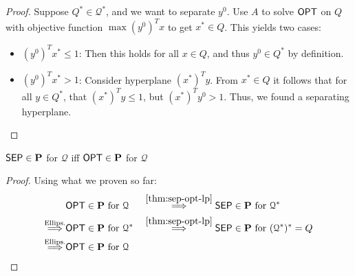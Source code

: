 \begin{proof}
    Suppose $Q^* \in \mathcal{Q}^*$, and we want to separate $y^0$.
    Use $A$ to solve $\mathsf{OPT}$ on $Q$ with objective function $\max (y^0)^Tx$ to get $x^* \in Q$.
    This yields two cases:
    \begin{itemize}
        \item $(y^0)^Tx^* \leq 1$: Then this holds for all $x \in Q$, and thus $y^0 \in Q^*$ by definition.
        \item $(y^0)^Tx^* > 1$: Consider hyperplane $(x^*)^Ty$. From $x^* \in Q$ it follows that
              for all $y \in Q^*$, that $(x^*)^Ty \leq 1$, but $(x^*)^Ty^0 > 1$. Thus, we found a separating hyperplane.
    \end{itemize}
\end{proof}
\begin{theorem}
    $\mathsf{SEP} \in \mathbf{P}$ for $\mathcal{Q}$ iff $\mathsf{OPT} \in \mathbf{P}$ for $\mathcal{Q}$
\end{theorem}
\begin{proof} Using what we proven so far:
    \begin{align*}
                                       & \OPT \in \pP \text{ for } \mathcal{Q}   &  & \overset{\ref{thm:sep-opt-lp}}{\IMP}  \SEP \in \pP \text{ for } \mathcal{Q}^*       \\
        \overset{\text{Ellips.}}{\IMP} & \OPT \in \pP \text{ for } \mathcal{Q}^* &  & \overset{\ref{thm:sep-opt-lp}}{\IMP}  \SEP \in \pP \text{ for } (\mathcal{Q}^*)^*=Q \\
        \overset{\text{Ellips.}}{\IMP} & \OPT \in \pP \text{ for } \mathcal{Q}
    \end{align*}
\end{proof}